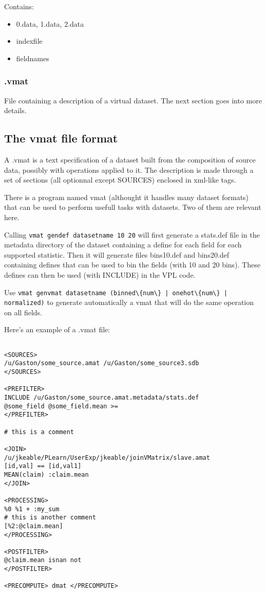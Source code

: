 \documentclass[11pt]{book}
\begin{document}
Contains:
\begin{itemize}
\item 0.data, 1.data, 2.data
\item indexfile
\item fieldnames
\end{itemize}

\subsubsection{.vmat}

File containing a description of a virtual dataset. The next section goes into more details.

\subsection{The vmat file format}

A .vmat is a text specification of a dataset built from the composition of source data, possibly with operations applied to it. The description is made through a set of sections (all optionnal except SOURCES) enclosed in xml-like tags.

There is a program named vmat (althought it handles many dataset formats) that can be used to perform usefull tasks with datasets. Two of them are relevant here. 

Calling \verb!vmat gendef datasetname 10 20! will first generate a stats.def file in the metadata directory of the dataset containing a define for each field for each supported statistic. Then it will generate files bins10.def and bins20.def containing defines that can be used to bin the fields (with 10 and 20 bins). These defines can then be used (with INCLUDE) in the VPL code.

Use \verb!vmat genvmat datasetname (binned\{num\} | onehot\{num\} | normalized)! to generate automatically a vmat that will do the same operation on all fields.

Here's an example of a .vmat file:

\begin{verbatim}

<SOURCES>
/u/Gaston/some_source.amat /u/Gaston/some_source3.sdb
</SOURCES>

<PREFILTER>
INCLUDE /u/Gaston/some_source.amat.metadata/stats.def
@some_field @some_field.mean >=
</PREFILTER>

# this is a comment

<JOIN>
/u/jkeable/PLearn/UserExp/jkeable/joinVMatrix/slave.amat
[id,val] == [id,val1]
MEAN(claim) :claim.mean
</JOIN>

<PROCESSING>
%0 %1 + :my_sum
# this is another comment
[%2:@claim.mean]
</PROCESSING>

<POSTFILTER>
@claim.mean isnan not
</POSTFILTER>

<PRECOMPUTE> dmat </PRECOMPUTE>

\end{verbatim}
\end{document}
